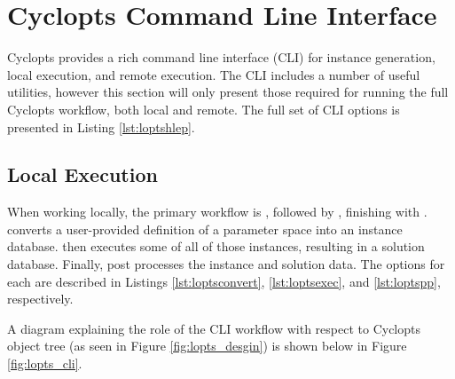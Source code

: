 
\chapter{Cyclopts Command Line Interface}\label{method:tools:cli}

Cyclopts provides a rich command line interface (CLI) for instance generation,
local execution, and remote execution. The CLI includes a number of useful
utilities, however this section will only present those required for running the
full Cyclopts workflow, both local and remote. The full set of CLI options is
presented in Listing \ref{lst:loptshlep}.



\section{Local Execution}

When working locally, the primary workflow is , followed
by , finishing with .  converts a user-provided definition of a parameter space into an
instance database.  then executes some of all of those
instances, resulting in a solution database. Finally,  post
processes the instance and solution data. The options for each are described in
Listings \ref{lst:loptsconvert}, \ref{lst:loptsexec}, and \ref{lst:loptspp},
respectively.







A diagram explaining the role of the CLI workflow with respect to Cyclopts
object tree (as seen in Figure \ref{fig:lopts_desgin}) is shown below in Figure
\ref{fig:lopts_cli}.

